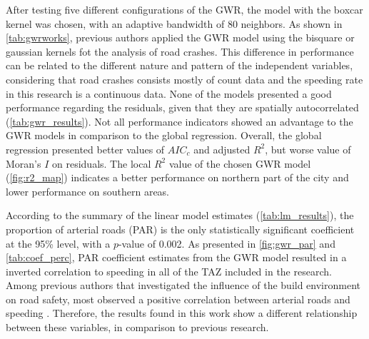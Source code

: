 After testing five different configurations of the GWR, the model with the boxcar kernel was chosen, with an adaptive bandwidth of 80 neighbors. As shown in \autoref{tab:gwrworks}, previous authors applied the GWR model using the bisquare or gaussian kernels fot the analysis of road crashes. This difference in performance can be related to the different nature and pattern of the independent variables, considering that road crashes consists mostly of count data and the speeding rate in this research is a continuous data. None of the models presented a good performance regarding the residuals, given that they are spatially autocorrelated (\autoref{tab:gwr_results}). Not all performance indicators showed an advantage to the GWR models in comparison to the global regression. Overall, the global regression presented better values of $AIC_c$ and adjusted $R^2$, but worse value of Moran's $I$ on residuals. The local $R^2$ value of the chosen GWR model (\autoref{fig:r2_map}) indicates a better performance on northern part of the city and lower performance on southern areas.




According to the summary of the linear model estimates (\autoref{tab:lm_results}), the proportion of arterial roads (PAR) is the only statistically significant coefficient at the 95\% level, with a $p$-value of 0.002. As presented in \autoref{fig:gwr_par} and \autoref{tab:coef_perc}, PAR coefficient estimates from the GWR model resulted in a inverted correlation to speeding in all of the TAZ included in the research. Among previous authors that investigated the influence of the build environment on road safety, most observed a positive correlation between arterial roads and speeding \cite{Dumbaugh2011,Ewing2009, Huang2018,Obelheiro2020}. Therefore, the results found in this work show a different relationship between these variables, in comparison to previous research. 


